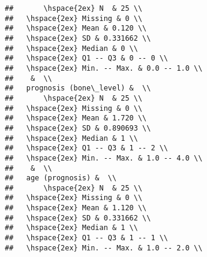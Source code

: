 \documentclass{article}\usepackage[]{graphicx}\usepackage[]{color}
\makeatletter
\newenvironment{kframe}{%
 \def\at@end@of@kframe{}%
 \ifinner\ifhmode%
  \def\at@end@of@kframe{\end{minipage}}%
  \begin{minipage}{\columnwidth}%
 \fi\fi%
 \def\FrameCommand##1{\hskip\@totalleftmargin \hskip-\fboxsep
 \colorbox{shadecolor}{##1}\hskip-\fboxsep
     \hskip-\linewidth \hskip-\@totalleftmargin \hskip\columnwidth}%
 \MakeFramed {\advance\hsize-\width
   \@totalleftmargin\z@ \linewidth\hsize
   \@setminipage}}%
 {\par\unskip\endMakeFramed%
 \at@end@of@kframe}
\newenvironment{knitrout}{}{} %
\makeatother
\begin{document}
\begin{knitrout}
\begin{kframe}
\begin{verbatim}
##       \hspace{2ex} N  & 25 \\ 
##   \hspace{2ex} Missing & 0 \\ 
##   \hspace{2ex} Mean & 0.120 \\ 
##   \hspace{2ex} SD & 0.331662 \\ 
##   \hspace{2ex} Median & 0 \\ 
##   \hspace{2ex} Q1 -- Q3 & 0 -- 0 \\ 
##   \hspace{2ex} Min. -- Max. & 0.0 -- 1.0 \\ 
##    &  \\ 
##   prognosis (bone\_level) &  \\ 
##       \hspace{2ex} N  & 25 \\ 
##   \hspace{2ex} Missing & 0 \\ 
##   \hspace{2ex} Mean & 1.720 \\ 
##   \hspace{2ex} SD & 0.890693 \\ 
##   \hspace{2ex} Median & 1 \\ 
##   \hspace{2ex} Q1 -- Q3 & 1 -- 2 \\ 
##   \hspace{2ex} Min. -- Max. & 1.0 -- 4.0 \\ 
##    &  \\ 
##   age (prognosis) &  \\ 
##       \hspace{2ex} N  & 25 \\ 
##   \hspace{2ex} Missing & 0 \\ 
##   \hspace{2ex} Mean & 1.120 \\ 
##   \hspace{2ex} SD & 0.331662 \\ 
##   \hspace{2ex} Median & 1 \\ 
##   \hspace{2ex} Q1 -- Q3 & 1 -- 1 \\ 
##   \hspace{2ex} Min. -- Max. & 1.0 -- 2.0 \\ 

\end{verbatim}
\end{kframe}
\end{knitrout}
\end{document}
